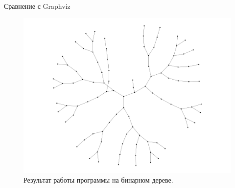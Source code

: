 \documentclass{beamer}
\begin{document}
\begin{frame}{Сравнение с Graphviz}
\begin{figure}[H]
\begin{minipage}[t]{.32\textwidth}
			\caption*{алгоритм Камады-Кавай}
		\end{minipage}
		\begin{minipage}[t]{.32\textwidth}
			\centering
			\includegraphics[width=\linewidth]{./imgs/bin_tree_gv.png}
			\caption*{Graphviz.}
		\end{minipage}
		\caption{Результат работы программы на бинарном дереве.}
	\end{figure}
\end{frame}
\end{document}
